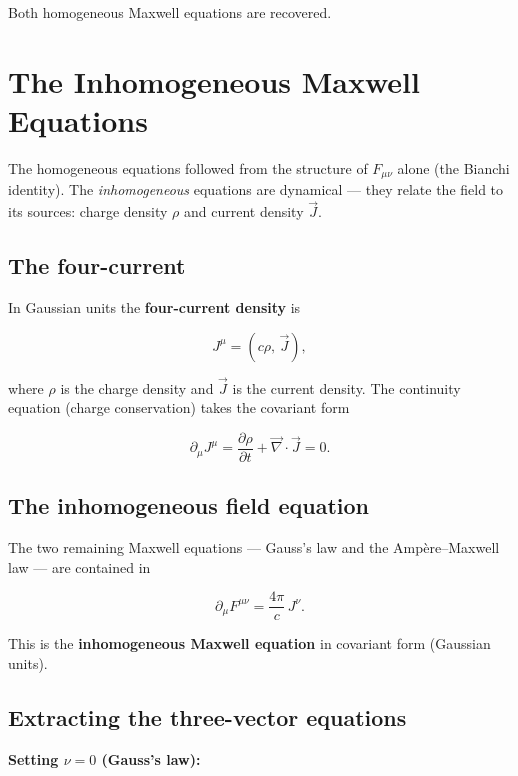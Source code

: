 Both homogeneous Maxwell equations are recovered.

\section{The Inhomogeneous Maxwell Equations}

The homogeneous equations followed from the structure of $F_{\mu\nu}$ alone (the Bianchi identity). The \emph{inhomogeneous} equations are dynamical --- they relate the field to its sources: charge density $\rho$ and current density $\vec{J}$.

\subsection{The four-current}

In Gaussian units the \textbf{four-current density} is

\begin{equation}
J^\mu = (c\rho,\, \vec{J}),
\end{equation}

where $\rho$ is the charge density and $\vec{J}$ is the current density. The continuity equation (charge conservation) takes the covariant form

\begin{equation}
\partial_\mu J^\mu = \frac{\partial\rho}{\partial t} + \vec{\nabla}\cdot\vec{J} = 0.
\end{equation}

\subsection{The inhomogeneous field equation}

The two remaining Maxwell equations --- Gauss's law and the Amp\`ere--Maxwell law --- are contained in

\begin{equation}
\boxed{\partial_\mu F^{\mu\nu} = \frac{4\pi}{c}\,J^\nu.}
\end{equation}

This is the \textbf{inhomogeneous Maxwell equation} in covariant form (Gaussian units).

\subsection{Extracting the three-vector equations}

\textbf{Setting $\nu = 0$ (Gauss's law):}

